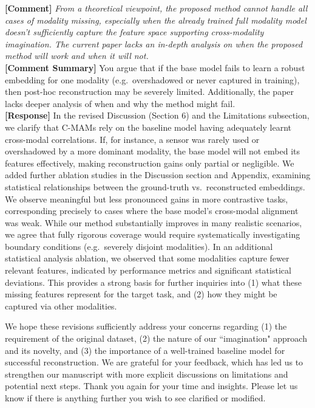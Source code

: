 \documentclass{article}
\begin{document}
\vspace{0.25cm}
\hline
\vspace{0.25cm}

\noindent\textbf{[Comment]} \textit{From a theoretical viewpoint, the proposed method cannot handle all cases of modality missing, especially when the already
trained full modality model doesn't sufficiently capture the feature space supporting cross-modality imagination. The current
paper lacks an in-depth analysis on when the proposed method will work and when it will not.}
\\

\noindent\textbf{[Comment Summary]} You argue that if the base model fails to learn a robust embedding for one modality (e.g.\ overshadowed or never captured in training), then post-hoc reconstruction may be severely limited. Additionally, the paper lacks deeper analysis of when and why the method might fail.
\\

\noindent\textbf{[Response]} In the revised Discussion (Section 6) and the Limitations subsection, we clarify that C-MAMs rely on the baseline model having adequately learnt cross-modal correlations. If, for instance, a sensor was rarely used or overshadowed by a more dominant modality, the base model will not embed its features effectively, making reconstruction gains only partial or negligible. We added further ablation studies in the Discussion section and Appendix, examining statistical relationships between the ground-truth vs.\ reconstructed embeddings. We observe meaningful but less pronounced gains in more contrastive tasks, corresponding precisely to cases where the base model's cross-modal alignment was weak. While our method substantially improves in many realistic scenarios, we agree that fully rigorous coverage would require systematically investigating boundary conditions (e.g.\ severely disjoint modalities). In an additional statistical analysis ablation, we observed that some modalities capture fewer relevant features, indicated by performance metrics and significant statistical deviations. This provides a strong basis for further inquiries into (1) what these missing features represent for the target task, and (2) how they might be captured via other modalities. \newline

\noindent We hope these revisions sufficiently address your concerns regarding (1) the requirement of the original dataset, (2) the nature of our ``imagination" approach and its novelty, and (3) the importance of a well-trained baseline model for successful reconstruction. We are grateful for your feedback, which has led us to strengthen our manuscript with more explicit discussions on limitations and potential next steps. Thank you again for your time and insights. Please let us know if there is anything further you wish to see clarified or modified.
\end{document}
